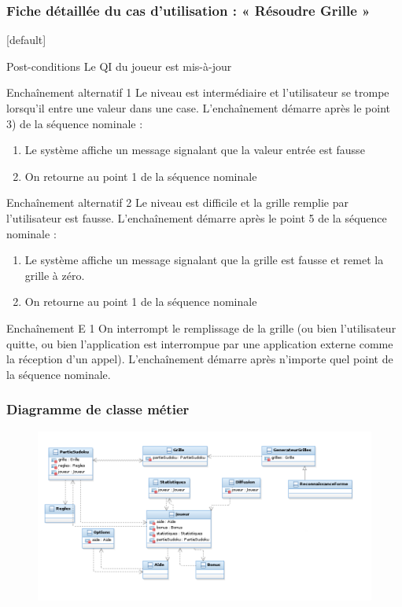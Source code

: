 \documentclass{beamer}
\begin{document}
\begin{frame}
\frametitle{Fiche détaillée du cas d'utilisation : « Résoudre Grille »}
[default]
  \begin{block}{\footnotesize{Post-conditions}}
    \scriptsize{Le QI du joueur est mis-à-jour}
  \end{block}
  \pause
  \begin{block}{\footnotesize{Enchaînement alternatif 1}}
    \scriptsize{Le niveau est intermédiaire et l’utilisateur se trompe lorsqu’il entre une valeur dans une case.
    L’enchaînement démarre après le point 3) de la séquence nominale :}
    \begin{enumerate}    
      [circle]
    \item
      \scriptsize{Le système affiche un message signalant que la valeur entrée est fausse}
    \item
      \scriptsize{On retourne au point 1 de la séquence nominale}
    \end{enumerate}
  \end{block}
  \pause
  \begin{block}{\footnotesize{Enchaînement alternatif 2}}
    \scriptsize{Le niveau est difficile et la grille remplie par l’utilisateur est fausse.
    L’enchaînement démarre après le point 5 de la séquence nominale :}
    \begin{enumerate}    
      [circle]
    \item
      \scriptsize{Le système affiche un message signalant que la grille est fausse et remet la grille à zéro.}
    \item
      \scriptsize{On retourne au point 1 de la séquence nominale}
    \end{enumerate}
  \end{block}
  \pause
  \begin{block}{\footnotesize{Enchaînement E 1}}
    \scriptsize{On interrompt le remplissage de la grille (ou bien l’utilisateur quitte, ou bien l’application est interrompue par une application externe comme la réception d’un appel).
L’enchaînement démarre après n’importe quel point de la séquence nominale.}
  \end{block}
\end{frame}
\begin{frame}
\frametitle{Diagramme de classe métier}
\begin{figure}[h]
  \includegraphics[scale=0.4]{diagrammeDeClasseMetier.png}
\end{figure}
\end{frame}
\end{document}
